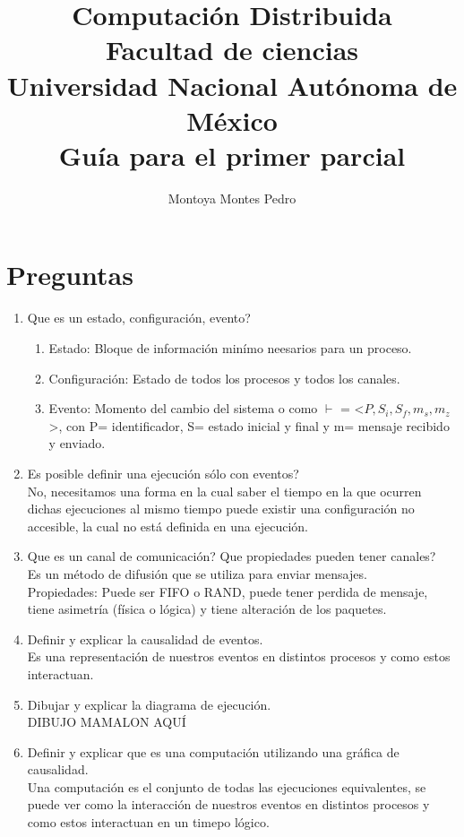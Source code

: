 \documentclass[letterpaper, 12pt]{article}
\title{Computación Distribuida\\Facultad de ciencias\\ Universidad Nacional Autónoma de México\\ Guía para el primer parcial}
\author{Montoya Montes Pedro}
\begin{document}
\maketitle

\tableofcontents
\newpage

\section{Preguntas}
	\begin{enumerate}
		\item Que es un estado, configuración, evento? 
			\begin{enumerate}
				\item Estado: Bloque de información minímo neesarios para un proceso.
				\item Configuración: Estado de todos los procesos y todos los canales.
				\item Evento: Momento del cambio del sistema o como $\vdash$ = <$P,S_{i},S_{f}, m_{s}, m_{z}$>, con P= identificador, S= estado inicial y final y m= mensaje recibido y enviado.
			\end{enumerate}
		\item Es posible definir una ejecución sólo con eventos? 
			\\ No, necesitamos una forma en la cual saber el tiempo en la que ocurren dichas ejecuciones al mismo tiempo puede existir una configuración no accesible, la cual no está definida en una ejecución.
		\item Que es un canal de comunicación? Que propiedades pueden tener canales?
			\\ Es un método de difusión que se utiliza para enviar mensajes.
			\\ Propiedades: Puede ser FIFO o RAND, puede tener perdida de mensaje, tiene asimetría (física o lógica) y tiene alteración de los paquetes.
		\item Definir y explicar la causalidad de eventos.
			\\ Es una representación de nuestros eventos en distintos procesos y como estos interactuan.
		\item Dibujar y explicar la diagrama de ejecución.
			\\ DIBUJO MAMALON AQUÍ
		\item Definir y explicar que es una computación utilizando una gráfica de causalidad.
			\\ Una computación es el conjunto de todas las ejecuciones equivalentes, se puede ver como la interacción de nuestros eventos en distintos procesos y como estos interactuan en un timepo lógico.

\end{enumerate}
\end{document}

